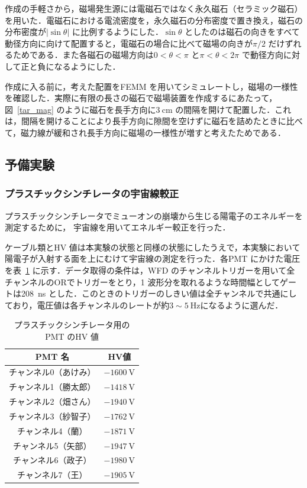作成の手軽さから，磁場発生源には電磁石ではなく永久磁石（セラミック磁石）を用いた．電磁石における電流密度を，永久磁石の分布密度で置き換え，磁石の分布密度が$|\sin\theta|$ に比例するようにした．$\sin\theta$ としたのは磁石の向きをすべて動径方向に向けて配置すると，電磁石の場合に比べて磁場の向きが$\pi/2$ だけずれるためである．また各磁石の磁場方向は$0 < \theta < \pi$ と$\pi < \theta < 2\pi$ で動径方向に対して正と負になるようにした．

作成に入る前に，考えた配置をFEMM を用いてシミュレートし，磁場の一様性を確認した．実際に有限の長さの磁石で磁場装置を作成するにあたって，図~\ref{tar_mag} のように磁石を長手方向に$3~\mathrm{cm}$ の間隔を開けて配置した．これは，間隔を開けることにより長手方向に隙間を空けずに磁石を詰めたときに比べて，磁力線が緩和され長手方向に磁場の一様性が増すと考えたためである．

\newpage

\subsection{予備実験}

\subsubsection{プラスチックシンチレータの宇宙線較正}
プラスチックシンチレータでミューオンの崩壊から生じる陽電子のエネルギーを測定するために， 宇宙線を用いてエネルギー較正を行った．

ケーブル類とHV 値は本実験の状態と同様の状態にしたうえで，本実験において陽電子が入射する面を上にむけて宇宙線の測定を行った．各PMT にかけた電圧を表~\ref{PS_PMT_HV} に示す．データ取得の条件は，WFD のチャンネルトリガーを用いて全チャンネルのORでトリガーをとり，1 波形分を取れるような時間幅としてゲートは208~ns とした．このときのトリガーのしきい値は全チャンネルで共通にしており，電圧値は各チャンネルのレートが約$3 \sim 5~\mathrm{Hz}$になるように選んだ．
\begin{table}[H]
\caption{プラスチックシンチレータ用のPMT のHV 値}
\label{PS_PMT_HV}
\centering
\begin{tabular}{cc}\toprule
PMT 名 & HV値 \\ \midrule
チャンネル0（あけみ）& $-1600~\mathrm{V}$ \\
チャンネル1（勝太郎）& $-1418~\mathrm{V}$ \\
チャンネル2（畑さん）& $-1940~\mathrm{V}$ \\
チャンネル3（紗智子）& $-1762~\mathrm{V}$ \\
チャンネル4（蘭）  & $-1871~\mathrm{V}$ \\
チャンネル5（矢部） & $-1947~\mathrm{V}$ \\
チャンネル6（政子） & $-1980~\mathrm{V}$ \\
チャンネル7（王）  & $-1905~\mathrm{V}$ \\ \bottomrule
\end{tabular} 
 \end{table}%

